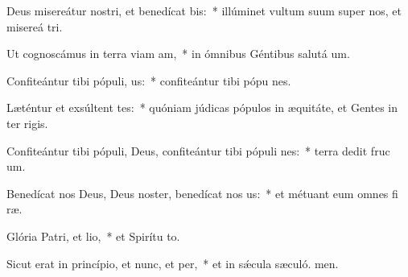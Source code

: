 \item Deus misereátur nostri, et benedícat bis:~* illúminet vultum suum super nos, et misereá tri.
\item Ut cognoscámus in terra viam am,~* in ómnibus Géntibus salutá um.
\item Confiteántur tibi pópuli, us:~* confiteántur tibi pópu nes.
\item Læténtur et exsúltent tes:~* quóniam júdicas pópulos in æquitáte, et Gentes in ter rigis.
\item Confiteántur tibi pópuli, Deus, confiteántur tibi pópuli nes:~* terra dedit fruc um.
\item Benedícat nos Deus, Deus noster, benedícat nos us:~* et métuant eum omnes fi ræ.
\item Glória Patri, et lio,~* et Spirítu to.
\item Sicut erat in princípio, et nunc, et per,~* et in sǽcula sæculó. men.
